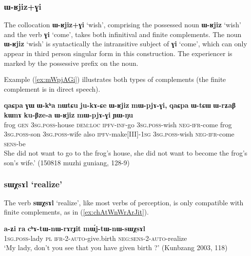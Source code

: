 \documentclass[oneside,a4paper,11pt]{article}
\newcommand{\ipa}[1]{\textbf{\phon#1}} %
\newcommand{\jpg}[2]{\ipa{#1} `#2'} %
\newcommand{\refb}[1]{(\ref{#1})}
\begin{document}
\subsubsection{\ipa{ɯ-ʁjiz+ɣi}}
The collocation \jpg{ɯ-ʁjiz+ɣi}{wish}, comprising the possessed noun \jpg{ɯ-ʁjiz}{wish} and the verb \jpg{ɣi}{come}, takes both infinitival and finite complements. The noun \jpg{ɯ-ʁjiz}{wish} is syntactically the intransitive subject of \jpg{ɣi}{come}, which can only appear in third person singular form in this construction. The experiencer is marked by the possessive prefix on the noun.

Example \refb{ex:mWpjAGi} illustrates both types of complements (the finite complement is in direct speech).
\begin{exe}
\ex \label{ex:mWpjAGi}
\gll 
\ipa{qaɕpa} 	\ipa{ɣɯ} 	\ipa{ɯ-kʰa} 	\ipa{nɯtɕu} 	\ipa{ju-kɤ-ɕe} 	\ipa{ɯ-ʁjiz} 	\ipa{mɯ-pjɤ-ɣi,} 	\ipa{qaɕpa} 	\ipa{ɯ-tɕɯ} 	\ipa{ɯ-rʑaβ} 	\ipa{kɯnɤ} 	\ipa{ku-βze-a} 	\ipa{ɯ-ʁjiz} 	\ipa{mɯ-pjɤ-ɣi} 	\ipa{ɲɯ-ŋu}  \\
frog \textsc{gen} \textsc{3sg.poss}-house \textsc{dem:loc} \textsc{ipfv-inf}-go \textsc{3sg.poss}-wish \textsc{neg-ifr}-come frog \textsc{3sg.poss}-son \textsc{3sg.poss}-wife also \textsc{ipfv}-make[III]-\textsc{1sg} 
\textsc{3sg.poss}-wish \textsc{neg-ifr}-come \textsc{sens}-be \\
\glt  She did not want to go to the frog's house, she did not want to become the frog's son's wife.' (150818 muzhi guniang, 128-9)
\end{exe}

\subsubsection{\jpg{sɯχsɤl}{realize}}
The verb \jpg{sɯχsɤl}{realize}, like most verbs of perception, is only compatible with finite complements, as in \refb{ex:chAtWnWrArJit}. 

\begin{exe}
\ex \label{ex:chAtWnWrArJit}
\gll \ipa{a-ʑi} 	\ipa{ra} 	\ipa{cʰɤ-tɯ-nɯ-rɤrɟit} 	\ipa{mɯ́j-tɯ-nɯ-sɯχsɤl}\\
\textsc{1sg.poss}-lady \textsc{pl} \textsc{ifr-2-auto}-give.birth \textsc{neg:sens-2-auto}-realize\\
\glt `My lady, don't you see that you have given birth ?' (Kunbzang 2003, 118)
\end{exe}
\end{document}
